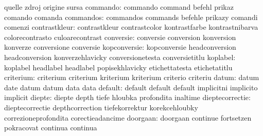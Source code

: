                            quelle                    zdroj
                           origine                   sursa
                 commando: commando                  command
                           befehl                    prikaz
                           comando                   comanda
                commandos: commandos                 commands
                           befehle                   prikazy
                           comandi                   comenzi
            contrastkleur: contrastkleur             contrastcolor
                           kontrastfarbe             kontrastnibarva
                           colorecontrasto           culoarecontrast
                conversie: conversie                 conversion
                           konversion                konverze
                           conversione               conversie
             kopconversie: kopconversie              headconversion
                           headconversion            konverzehlavicky
                           conversionetesta          conversietitlu %
                 koplabel: koplabel                  headlabel
                           headlabel                 popisekhlavicky
                           etichettatesta            etichetatitlu %
                criterium: criterium                 criterium
                           kriterium                 kriterium
                           criterio                  criteriu
                    datum: datum                     date
                           datum                     datum
                           data                      data
                  default: default                   default
                           default                   implicitni
                           implicito                 implicit
                   diepte: diepte                    depth
                           tiefe                     hloubka
                           profondita                inaltime
          dieptecorrectie: dieptecorrectie           depthcorrection
                           tiefekorrektur            korekcehloubky
                           correzioneprofondita      corectieadancime
                 doorgaan: doorgaan                  continue
                           fortsetzen                pokracovat
                           continua                  continua
